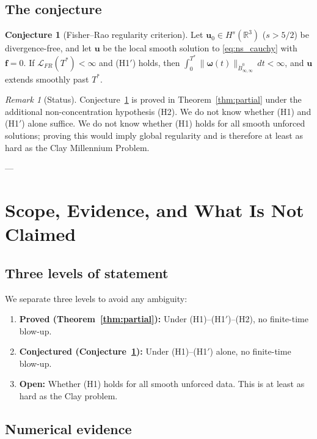 \documentclass[11pt,a4paper]{article}
\theoremstyle{definition}
\newtheorem{conjecture}[theorem]{Conjecture}
\theoremstyle{remark}
\newtheorem{remark}[theorem]{Remark}
\begin{document}
\subsection{The conjecture}

\begin{conjecture}[Fisher--Rao regularity criterion]
\label{conj:main}
Let $\mathbf{u}_0 \in H^s(\mathbb{R}^3)$ ($s>5/2$) be divergence-free, and let $\mathbf{u}$ be the local smooth solution to \eqref{eq:ns_cauchy} with $\mathbf{f}=0$. If $\mathcal{L}_{FR}(T^*) < \infty$ and (H1$'$) holds, then $\int_0^{T^*}\|\boldsymbol{\omega}(t)\|_{\dot{B}^0_{\infty,\infty}}\,dt < \infty$, and $\mathbf{u}$ extends smoothly past $T^*$.
\end{conjecture}

\begin{remark}[Status]
Conjecture~\ref{conj:main} is proved in Theorem~\ref{thm:partial} under the additional non-concentration hypothesis (H2). We do not know whether (H1) and (H1$'$) alone suffice. We do not know whether (H1) holds for all smooth unforced solutions; proving this would imply global regularity and is therefore at least as hard as the Clay Millennium Problem.
\end{remark}

---

\section{Scope, Evidence, and What Is Not Claimed}

\subsection{Three levels of statement}

We separate three levels to avoid any ambiguity:
\begin{enumerate}
  \item \textbf{Proved (Theorem~\ref{thm:partial}):} Under (H1)--(H1$'$)--(H2), no finite-time blow-up.
  \item \textbf{Conjectured (Conjecture~\ref{conj:main}):} Under (H1)--(H1$'$) alone, no finite-time blow-up.
  \item \textbf{Open:} Whether (H1) holds for all smooth unforced data. This is at least as hard as the Clay problem.
\end{enumerate}

\subsection{Numerical evidence}
\end{document}
